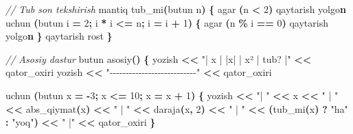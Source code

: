 \documentclass[a4paper,11pt,twoside,openright]{book}
\newenvironment{Shaded}{\begin{snugshade}}{\end{snugshade}}
\newcommand{\CharTok}[1]{\textcolor[rgb]{0.31,0.60,0.02}{#1}}
\newcommand{\CommentTok}[1]{\textcolor[rgb]{0.56,0.35,0.01}{\textit{#1}}}
\newcommand{\DecValTok}[1]{\textcolor[rgb]{0.00,0.00,0.81}{#1}}
\newcommand{\ErrorTok}[1]{\textcolor[rgb]{0.64,0.00,0.00}{\textbf{#1}}}
\newcommand{\NormalTok}[1]{#1}
\newcommand{\OperatorTok}[1]{\textcolor[rgb]{0.81,0.36,0.00}{\textbf{#1}}}
\newcommand{\StringTok}[1]{\textcolor[rgb]{0.31,0.60,0.02}{#1}}
\begin{document}
\begin{Shaded}
\begin{Highlighting}[]
\CommentTok{// Tub son tekshirish}
\NormalTok{mantiq tub\_mi}\OperatorTok{(}\NormalTok{butun n}\OperatorTok{)} \OperatorTok{\{}
\NormalTok{    agar }\OperatorTok{(}\NormalTok{n }\OperatorTok{\textless{}} \DecValTok{2}\OperatorTok{)}\NormalTok{ qaytarish yolg}\CharTok{\textquotesingle{}o}\ErrorTok{n}
\NormalTok{    uchun }\OperatorTok{(}\NormalTok{butun i }\OperatorTok{=} \DecValTok{2}\OperatorTok{;}\NormalTok{ i }\OperatorTok{*}\NormalTok{ i }\OperatorTok{\textless{}=}\NormalTok{ n}\OperatorTok{;}\NormalTok{ i }\OperatorTok{=}\NormalTok{ i }\OperatorTok{+} \DecValTok{1}\OperatorTok{)} \OperatorTok{\{}
\NormalTok{        agar }\OperatorTok{(}\NormalTok{n }\OperatorTok{\%}\NormalTok{ i }\OperatorTok{==} \DecValTok{0}\OperatorTok{)}\NormalTok{ qaytarish yolg}\CharTok{\textquotesingle{}o}\ErrorTok{n}
    \OperatorTok{\}}
\NormalTok{    qaytarish rost}
\OperatorTok{\}}

\CommentTok{// Asosiy dastur}
\NormalTok{butun asosiy}\OperatorTok{()} \OperatorTok{\{}
\NormalTok{    yozish }\OperatorTok{\textless{}\textless{}} \StringTok{"|  x  | |x| | x² | tub? |"} \OperatorTok{\textless{}\textless{}}\NormalTok{ qator\_oxiri}
\NormalTok{    yozish }\OperatorTok{\textless{}\textless{}} \StringTok{"{-}{-}{-}{-}{-}{-}{-}{-}{-}{-}{-}{-}{-}{-}{-}{-}{-}{-}{-}{-}{-}{-}{-}{-}{-}{-}{-}"} \OperatorTok{\textless{}\textless{}}\NormalTok{ qator\_oxiri}

\NormalTok{    uchun }\OperatorTok{(}\NormalTok{butun x }\OperatorTok{=} \OperatorTok{{-}}\DecValTok{3}\OperatorTok{;}\NormalTok{ x }\OperatorTok{\textless{}=} \DecValTok{10}\OperatorTok{;}\NormalTok{ x }\OperatorTok{=}\NormalTok{ x }\OperatorTok{+} \DecValTok{1}\OperatorTok{)} \OperatorTok{\{}
\NormalTok{        yozish }\OperatorTok{\textless{}\textless{}} \StringTok{"| "} \OperatorTok{\textless{}\textless{}}\NormalTok{ x}
               \OperatorTok{\textless{}\textless{}} \StringTok{" | "} \OperatorTok{\textless{}\textless{}}\NormalTok{ abs\_qiymat}\OperatorTok{(}\NormalTok{x}\OperatorTok{)}
               \OperatorTok{\textless{}\textless{}} \StringTok{" | "} \OperatorTok{\textless{}\textless{}}\NormalTok{ daraja}\OperatorTok{(}\NormalTok{x}\OperatorTok{,} \DecValTok{2}\OperatorTok{)}
               \OperatorTok{\textless{}\textless{}} \StringTok{" | "} \OperatorTok{\textless{}\textless{}} \OperatorTok{(}\NormalTok{tub\_mi}\OperatorTok{(}\NormalTok{x}\OperatorTok{)} \OperatorTok{?} \StringTok{"ha"} \OperatorTok{:} \StringTok{"yo\textquotesingle{}q"}\OperatorTok{)}
               \OperatorTok{\textless{}\textless{}} \StringTok{" |"} \OperatorTok{\textless{}\textless{}}\NormalTok{ qator\_oxiri}
    \OperatorTok{\}}


\end{Highlighting}
\end{Shaded}
\end{document}
